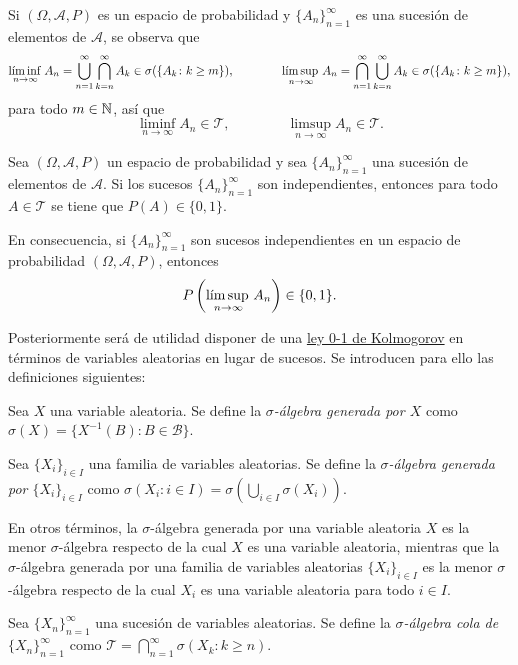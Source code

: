 \documentclass[a4paper, 11pt, extrafontsizes]{memoir}
\begin{document}
Si $(\Omega,\mathcal{A},P)$ es un espacio de probabilidad y $\{A_n\}_{n=1}^\infty$ es una sucesión de elementos de $\mathcal{A}$, se observa que
\[\linf_{n \to \infty} A_n = \bigcup_{n=1}^\infty \bigcap_{k= n}^\infty A_k \in \sigma(\{A_k \colon k \geq m\}), \qquad \qquad \lsup_{n \to \infty} A_n = \bigcap_{n=1}^\infty \bigcup_{k= n}^\infty A_k \in \sigma(\{A_k \colon k \geq m\}),\]
para todo $m \in \N$, así que
\[\liminf_{ n \to \infty} A_n \in \mathcal{T}, \qquad \qquad \limsup_{n \to \infty} A_n \in \mathcal{T}.\]

\begin{theorem}\label{teo:1.10.5}
    Sea $(\Omega,\mathcal{A},P)$ un espacio de probabilidad y sea $\{A_n\}_{n=1}^\infty$ una sucesión de elementos de $\mathcal{A}$. Si los sucesos $\{A_n\}_{n=1}^\infty$ son independientes, entonces para todo $A \in \mathcal{T}$ se tiene que $P(A) \in \{0,1\}$.
\end{theorem}

En consecuencia, si $\{A_n\}_{n=1}^\infty$ son sucesos independientes en un espacio de probabilidad $(\Omega,\mathcal{A},P)$, entonces
\[P\left(\lsup_{n \to \infty}A_n\right) \in \{0,1\}.\]

Posteriormente será de utilidad disponer de una \hyperref[teo:1.10.5]{\color{gray}ley 0-1 de Kolmogorov} en términos de variables aleatorias en lugar de sucesos. Se introducen para ello las definiciones siguientes:

\begin{definition}
Sea $X$ una variable aleatoria. Se define la \emph{$\sigma$-álgebra generada por $X$} como
$\sigma(X) = \{X^{-1}(B) \colon B \in \mathcal{B}\}$.
\end{definition}

\begin{definition}
    Sea $\{X_i\}_{i \in I}$ una familia de variables aleatorias. Se define la \emph{$\sigma$-álgebra generada por $\{X_i\}_{i \in I}$} como
    $\sigma(X_i \colon i \in I) = \sigma(\bigcup_{i \in I} \sigma(X_i))$.
\end{definition}

En otros términos, la $\sigma$-álgebra generada por una variable aleatoria $X$ es la menor $\sigma$-álgebra respecto de la cual $X$ es una variable aleatoria, mientras que la $\sigma$-álgebra generada por una familia de variables aleatorias $\{X_i\}_{i \in I}$ es la menor $\sigma$-álgebra respecto de la cual $X_i$ es una variable aleatoria para todo $i \in I$.

\begin{definition}
    Sea $\{X_n\}_{n=1}^\infty$ una sucesión de variables aleatorias. Se define la \emph{$\sigma$-álgebra cola de $\{X_n\}_{n=1}^\infty$} como $\mathcal{T} = \bigcap_{n=1}^\infty \sigma(X_k \colon k \geq n)$.
\end{definition}
\end{document}
